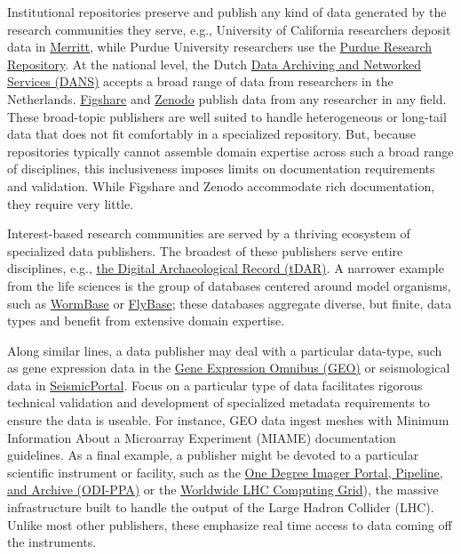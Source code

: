 \documentclass[10pt,a4paper,twocolumn]{article}
\begin{document}
{{Institutional repositories preserve and publish any kind of data generated by the research communities they serve, e.g., University of California researchers deposit data in \href{https://merritt.cdlib.org/}{Merritt}, while Purdue University researchers use the \href{https://purr.purdue.edu/}{Purdue Research Repository}.
At the national level, the Dutch \href{http://www.dans.knaw.nl/en}{Data Archiving and Networked Services (DANS)} accepts a broad range of data from researchers in the Netherlands.
\href{http://figshare.com/}{Figshare} and \href{http://zenodo.org/}{Zenodo} publish data from any researcher in any field.
These broad-topic publishers are well suited to handle heterogeneous or long-tail data that does not fit comfortably in a specialized repository.
But, because repositories typically cannot assemble domain expertise across such a broad range of disciplines, this inclusiveness imposes limits on documentation requirements and validation.
While Figshare and Zenodo accommodate rich documentation, they require very little.

Interest-based research communities are served by a thriving ecosystem of specialized data publishers.
The broadest of these publishers serve entire disciplines, e.g., \href{http://www.tdar.org/}{the Digital Archaeological Record (tDAR)}.
A narrower example from the life sciences is the group of databases centered around model organisms, such as \href{http://www.wormbase.org/}{WormBase}\cite{harris_wormbase_2014} or \href{http://flybase.org/}{FlyBase}\cite{pierre_flybase_2014}; these databases aggregate diverse, but finite, data types and benefit from extensive domain expertise.

Along similar lines, a data publisher may deal with a particular data-type, such as gene expression data in the \href{http://www.ncbi.nlm.nih.gov/geo/}{Gene Expression Omnibus (GEO)} or seismological data in \href{http://www.seismicportal.eu/}{SeismicPortal}.
Focus on a particular type of data facilitates rigorous technical validation and development of specialized metadata requirements to ensure the data is useable.
For instance, GEO data ingest meshes with Minimum Information About a Microarray Experiment (MIAME)\cite{brazma_minimum_2001} documentation guidelines\cite{edgar_ncbi_2006}.
As a final example, a publisher might be devoted to a particular scientific instrument or facility, such as the \href{http://portal.odi.iu.edu}{One Degree Imager Portal, Pipeline, and Archive (ODI-PPA)} or the \href{http://wlcg.web.cern.ch/}{Worldwide LHC Computing Grid}), the massive infrastructure built to handle the output of the Large Hadron Collider (LHC).
Unlike most other publishers, these emphasize real time access to data coming off the instruments.

}}
\end{document}
